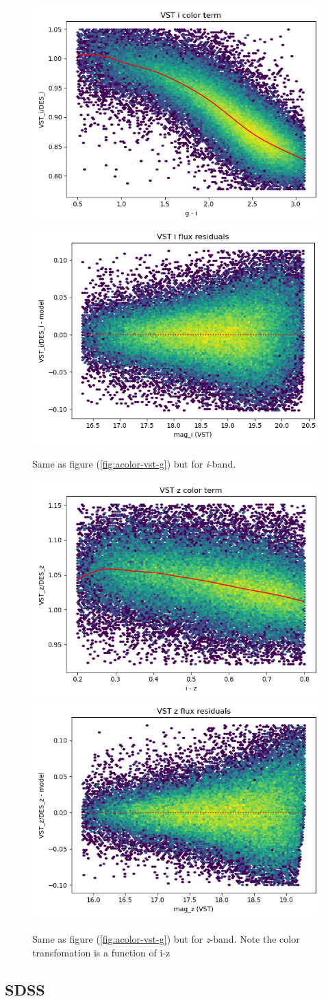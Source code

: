 \begin{figure}
    \includegraphics[width=0.49\linewidth]{./figures/color_terms/VST_to_DES_band_i_color_term.png}
    \includegraphics[width=0.49\linewidth]{./figures/color_terms/VST_to_DES_band_i_flux_residuals.png}
    \caption{Same as figure (\ref{fig:acolor-vst-g}) but for \textit{i}-band.}
\end{figure}
\begin{figure}
    \includegraphics[width=0.49\linewidth]{./figures/color_terms/VST_to_DES_band_z_color_term.png}
    \includegraphics[width=0.49\linewidth]{./figures/color_terms/VST_to_DES_band_z_flux_residuals.png}
    \caption{Same as figure (\ref{fig:acolor-vst-g}) but for \textit{z}-band. Note the color transfomation is a function of i-z}
\end{figure}

\subsection{SDSS}